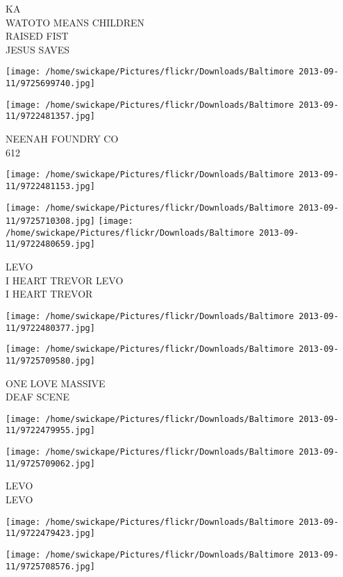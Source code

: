 \documentclass[10pt,letterpaper]{article}
\begin{document}
KA\\
WATOTO MEANS CHILDREN\\
RAISED FIST\\
JESUS SAVES
\pagebreak

\texttt{[image: /home/swickape/Pictures/flickr/Downloads/Baltimore 2013-09-11/9725699740.jpg]}

\vspace{0.25in}
\texttt{[image: /home/swickape/Pictures/flickr/Downloads/Baltimore 2013-09-11/9722481357.jpg]}

NEENAH FOUNDRY CO\\
612
\pagebreak

\texttt{[image: /home/swickape/Pictures/flickr/Downloads/Baltimore 2013-09-11/9722481153.jpg]}

\vspace{0.25in}
\texttt{[image: /home/swickape/Pictures/flickr/Downloads/Baltimore 2013-09-11/9725710308.jpg]}
\texttt{[image: /home/swickape/Pictures/flickr/Downloads/Baltimore 2013-09-11/9722480659.jpg]}

LEVO\\
I HEART TREVOR LEVO\\
I HEART TREVOR
\pagebreak

\texttt{[image: /home/swickape/Pictures/flickr/Downloads/Baltimore 2013-09-11/9722480377.jpg]}

\vspace{0.25in}
\texttt{[image: /home/swickape/Pictures/flickr/Downloads/Baltimore 2013-09-11/9725709580.jpg]}

ONE LOVE MASSIVE\\
DEAF SCENE
\pagebreak

\texttt{[image: /home/swickape/Pictures/flickr/Downloads/Baltimore 2013-09-11/9722479955.jpg]}

\vspace{0.25in}
\texttt{[image: /home/swickape/Pictures/flickr/Downloads/Baltimore 2013-09-11/9725709062.jpg]}

LEVO\\
LEVO
\pagebreak

\texttt{[image: /home/swickape/Pictures/flickr/Downloads/Baltimore 2013-09-11/9722479423.jpg]}

\vspace{0.25in}
\texttt{[image: /home/swickape/Pictures/flickr/Downloads/Baltimore 2013-09-11/9725708576.jpg]}
\end{document}
